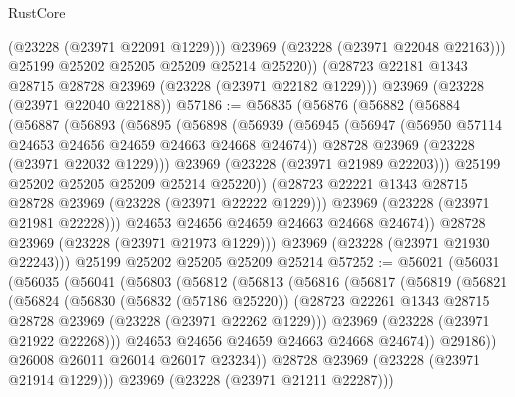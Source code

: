 \begin{lexlean}{RustCore}
\begin{coremodule}
            (@23228 (@23971 @22091 @1229)))
          @23969
          (@23228 (@23971 @22048 @22163)))
        @25199
        @25202
        @25205
        @25209
        @25214
        @25220))
    (@28723 @22181 @1343 @28715 @28728 @23969 (@23228 (@23971 @22182 @1229)))
    @23969
    (@23228 (@23971 @22040 @22188))
@57186 := @56835
    (@56876
      (@56882
        (@56884
          (@56887
            (@56893
              (@56895
                (@56898
                  (@56939
                    (@56945
                      (@56947 (@56950 @57114 @24653 @24656 @24659 @24663 @24668 @24674))
                      @28728
                      @23969
                      (@23228 (@23971 @22032 @1229)))
                    @23969
                    (@23228 (@23971 @21989 @22203)))
                  @25199
                  @25202
                  @25205
                  @25209
                  @25214
                  @25220))
              (@28723 @22221 @1343 @28715 @28728 @23969 (@23228 (@23971 @22222 @1229)))
              @23969
              (@23228 (@23971 @21981 @22228)))
            @24653
            @24656
            @24659
            @24663
            @24668
            @24674))
        @28728
        @23969
        (@23228 (@23971 @21973 @1229)))
      @23969
      (@23228 (@23971 @21930 @22243)))
    @25199
    @25202
    @25205
    @25209
    @25214
@57252 := @56021
    (@56031
      (@56035
        (@56041
          (@56803
            (@56812
              (@56813
                (@56816
                  (@56817
                    (@56819
                      (@56821
                        (@56824
                          (@56830
                            (@56832 (@57186 @25220))
                            (@28723
                              @22261
                              @1343
                              @28715
                              @28728
                              @23969
                              (@23228 (@23971 @22262 @1229)))
                            @23969
                            (@23228 (@23971 @21922 @22268)))
                          @24653
                          @24656
                          @24659
                          @24663
                          @24668
                          @24674))
                      @29186))
                  @26008
                  @26011
                  @26014
                  @26017
                  @23234))
              @28728
              @23969
              (@23228 (@23971 @21914 @1229)))
            @23969
            (@23228 (@23971 @21211 @22287)))

\end{coremodule}
\end{lexlean}
